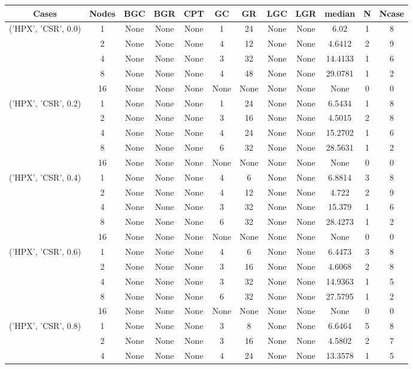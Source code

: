 \begin{tabular}{cccccccccccc}
\hline
Cases & Nodes& BGC& BGR& CPT& GC& GR& LGC& LGR& median & N & Ncase \\
\hline
\multirow{5}{*}{('HPX', 'CSR', 0.0)}& 1& None& None& None& 1& 24& None& None& 6.02& 1& 8\\
& 2& None& None& None& 4& 12& None& None& 4.6412& 2& 9\\
& 4& None& None& None& 3& 32& None& None& 14.4133& 1& 6\\
& 8& None& None& None& 4& 48& None& None& 29.0781& 1& 2\\
& 16& None& None& None& None& None& None& None& None& 0& 0\\
\hline
\multirow{5}{*}{('HPX', 'CSR', 0.2)}& 1& None& None& None& 1& 24& None& None& 6.5434& 1& 8\\
& 2& None& None& None& 3& 16& None& None& 4.5015& 2& 8\\
& 4& None& None& None& 4& 24& None& None& 15.2702& 1& 6\\
& 8& None& None& None& 6& 32& None& None& 28.5631& 1& 2\\
& 16& None& None& None& None& None& None& None& None& 0& 0\\
\hline
\multirow{5}{*}{('HPX', 'CSR', 0.4)}& 1& None& None& None& 4& 6& None& None& 6.8814& 3& 8\\
& 2& None& None& None& 4& 12& None& None& 4.722& 2& 9\\
& 4& None& None& None& 3& 32& None& None& 15.379& 1& 6\\
& 8& None& None& None& 6& 32& None& None& 28.4273& 1& 2\\
& 16& None& None& None& None& None& None& None& None& 0& 0\\
\hline
\multirow{5}{*}{('HPX', 'CSR', 0.6)}& 1& None& None& None& 4& 6& None& None& 6.4473& 3& 8\\
& 2& None& None& None& 3& 16& None& None& 4.6068& 2& 8\\
& 4& None& None& None& 3& 32& None& None& 14.9363& 1& 5\\
& 8& None& None& None& 6& 32& None& None& 27.5795& 1& 2\\
& 16& None& None& None& None& None& None& None& None& 0& 0\\
\hline
\multirow{5}{*}{('HPX', 'CSR', 0.8)}& 1& None& None& None& 3& 8& None& None& 6.6464& 5& 8\\
& 2& None& None& None& 3& 16& None& None& 4.5802& 2& 7\\
& 4& None& None& None& 4& 24& None& None& 13.3578& 1& 5\\

\end{tabular}
